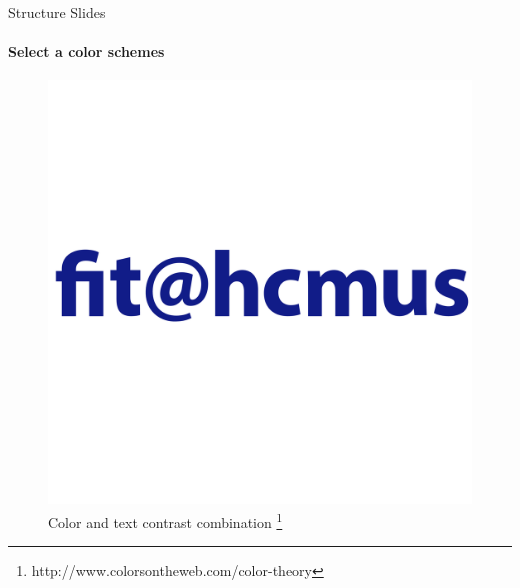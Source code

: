 \begin{frame}{Structure Slides}
    \framesubtitle{Select a color schemes}
    \begin{figure}[h]
        \centering
        \includegraphics[width = \linewidth]{imgs/fit_logo.png}
        \caption{Color and text contrast combination \footnote{http://www.colorsontheweb.com/color-theory}}
        \label{fig:overall}
    \end{figure}

\end{frame}